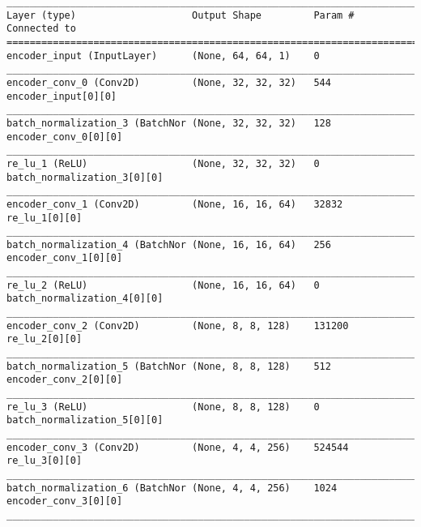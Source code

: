 \begin{lstlisting}[caption={dSprites-VAE-GAN Encoder},captionpos=b,basicstyle=\tiny, label={lst:mnist-vae-encoder}]
__________________________________________________________________________________________________
Layer (type)                    Output Shape         Param #     Connected to
==================================================================================================
encoder_input (InputLayer)      (None, 64, 64, 1)    0
__________________________________________________________________________________________________
encoder_conv_0 (Conv2D)         (None, 32, 32, 32)   544         encoder_input[0][0]
__________________________________________________________________________________________________
batch_normalization_3 (BatchNor (None, 32, 32, 32)   128         encoder_conv_0[0][0]
__________________________________________________________________________________________________
re_lu_1 (ReLU)                  (None, 32, 32, 32)   0           batch_normalization_3[0][0]
__________________________________________________________________________________________________
encoder_conv_1 (Conv2D)         (None, 16, 16, 64)   32832       re_lu_1[0][0]
__________________________________________________________________________________________________
batch_normalization_4 (BatchNor (None, 16, 16, 64)   256         encoder_conv_1[0][0]
__________________________________________________________________________________________________
re_lu_2 (ReLU)                  (None, 16, 16, 64)   0           batch_normalization_4[0][0]
__________________________________________________________________________________________________
encoder_conv_2 (Conv2D)         (None, 8, 8, 128)    131200      re_lu_2[0][0]
__________________________________________________________________________________________________
batch_normalization_5 (BatchNor (None, 8, 8, 128)    512         encoder_conv_2[0][0]
__________________________________________________________________________________________________
re_lu_3 (ReLU)                  (None, 8, 8, 128)    0           batch_normalization_5[0][0]
__________________________________________________________________________________________________
encoder_conv_3 (Conv2D)         (None, 4, 4, 256)    524544      re_lu_3[0][0]
__________________________________________________________________________________________________
batch_normalization_6 (BatchNor (None, 4, 4, 256)    1024        encoder_conv_3[0][0]
__________________________________________________________________________________________________

\end{lstlisting}

